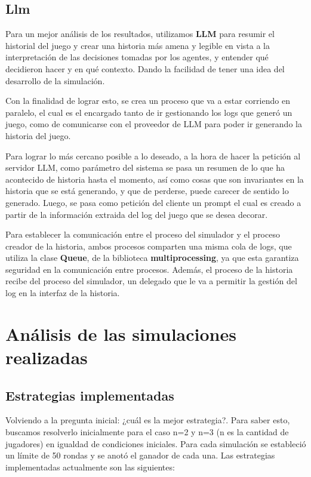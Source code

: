 \documentclass[11pt]{article}
\begin{document}
        \subsection{Llm}
        Para un mejor análisis de los resultados, utilizamos \textbf{LLM} para resumir el historial del juego y 
        crear una historia más amena y legible en vista a la interpretación de las decisiones tomadas por 
        los agentes, y entender qué decidieron hacer y en qué contexto. Dando la facilidad de tener una 
        idea del desarrollo de la simulación.\vspace{5mm}

        \noindent Con la finalidad de lograr esto, se crea un proceso que va a estar corriendo en paralelo, el cual 
        es el encargado tanto de ir gestionando los logs que generó un juego, como de comunicarse con el 
        proveedor de LLM para poder ir generando la historia del juego.\vspace{5mm}

        \noindent Para lograr lo más cercano posible a lo deseado, a la hora de hacer la petición al servidor LLM, 
        como parámetro del sistema se pasa un resumen de lo que ha acontecido de historia hasta el momento, 
        así como cosas que son invariantes en la historia que se está generando, y que de perderse, puede 
        carecer de sentido lo generado. Luego, se pasa como petición del cliente un prompt el cual es creado 
        a partir de la información extraida del log del juego que se desea decorar.\vspace{5mm}

        \noindent Para establecer la comunicación entre el proceso del simulador y el proceso creador de la historia, 
        ambos procesos comparten una misma cola de logs, que utiliza la clase \textbf{Queue}, de la biblioteca 
        \textbf{multiprocessing}, ya que esta garantiza seguridad en la comunicación entre procesos. Además, el 
        proceso de la historia recibe del proceso del simulador, un delegado que le va a permitir la gestión 
        del log en la interfaz de la historia.

    \newpage

    \section{Análisis de las simulaciones realizadas}
        \subsection{Estrategias implementadas}
        Volviendo a la pregunta inicial: ¿cuál es la mejor estrategia?. Para saber esto, buscamos resolverlo 
        inicialmente para el caso n=2 y n=3 (n es la cantidad de jugadores) en igualdad de condiciones iniciales.
        Para cada simulación se estableció un límite de 50 rondas y se anotó el ganador de cada una. Las estrategias
        implementadas actualmente son las siguientes:
\end{document}

